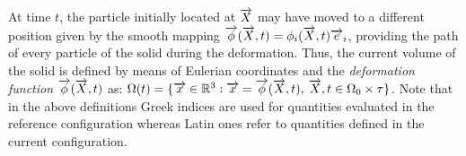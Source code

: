 At time $t$, the particle initially located at ${\overrightarrow{X}}$ may have moved to a different position given by the smooth mapping ${\overrightarrow{\phi}}({\overrightarrow{X}},t)=\phi_i({\overrightarrow{X}},t){\overrightarrow{e}}_i$, providing the path of every particle of the solid during the deformation.
Thus, the current volume of the solid is defined by means of Eulerian coordinates and the \textit{deformation function} ${\overrightarrow{\phi}}({\overrightarrow{X}},t)$ as: $\Omega(t)=\{{\overrightarrow{x}}\in \mathbb{R}^3: {\overrightarrow{x}}={\overrightarrow{\phi}}({\overrightarrow{X}},t),\: {\overrightarrow{X}},t\in\Omega_0\times \tau\}$.
Note that in the above definitions Greek indices are used for quantities evaluated in the reference configuration whereas Latin ones refer to quantities defined in the current configuration.

